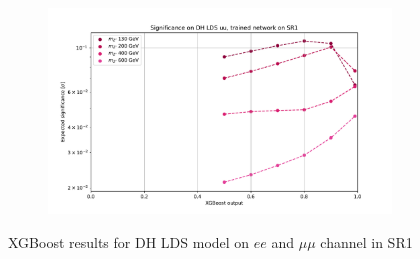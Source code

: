 \documentclass[12pt, a4paper]{book}
\begin{document}
\begin{figure}[!ht]
\begin{subfigure}[b]{0.49\textwidth}
   \end{subfigure}
   \hfill
   \begin{subfigure}[b]{0.49\textwidth}
      \centering
      \includegraphics[width=1\textwidth]{XGBoost/Model_independent/50-100/DH_LDS/EXP_SIG_uu.pdf}
   \end{subfigure}
   \caption{XGBoost results for DH LDS model on $ee$ and $\mu\mu$ channel in SR1}\label{fig:DH_LDS_SR1}
\end{figure}
\end{document}
